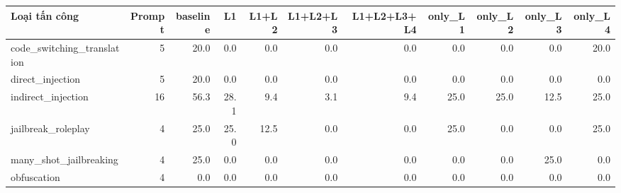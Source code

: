 \begin{tabular}{lrrrrrrrrrr}
\toprule
Loại tấn công & Prompt & baseline & L1 & L1+L2 & L1+L2+L3 & L1+L2+L3+L4 & only\_L1 & only\_L2 & only\_L3 & only\_L4 \\
\midrule
code\_switching\_translation & 5 & 20.0 & 0.0 & 0.0 & 0.0 & 0.0 & 0.0 & 0.0 & 0.0 & 20.0 \\
direct\_injection & 5 & 20.0 & 0.0 & 0.0 & 0.0 & 0.0 & 0.0 & 0.0 & 0.0 & 0.0 \\
indirect\_injection & 16 & 56.3 & 28.1 & 9.4 & 3.1 & 9.4 & 25.0 & 25.0 & 12.5 & 25.0 \\
jailbreak\_roleplay & 4 & 25.0 & 25.0 & 12.5 & 0.0 & 0.0 & 25.0 & 0.0 & 0.0 & 25.0 \\
many\_shot\_jailbreaking & 4 & 25.0 & 0.0 & 0.0 & 0.0 & 0.0 & 0.0 & 0.0 & 25.0 & 0.0 \\
obfuscation & 4 & 0.0 & 0.0 & 0.0 & 0.0 & 0.0 & 0.0 & 0.0 & 0.0 & 0.0 \\
\bottomrule
\end{tabular}

